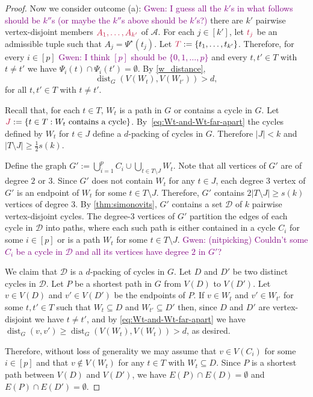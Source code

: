 \documentclass{patmorin}
\newcommand{\gwen}[1]{\textcolor{Purple}{Gwen: #1}}
\DeclareMathOperator{\dist}{dist}
\DeclarePairedDelimiter\set{\{}{\}}
\begin{document}
\begin{proof}
Now we consider outcome (a): 
\gwen{I guess all the $k'$s in what follows should be $k''$s (or maybe the $k''$s above should be $k'$s?)}
there are $k'$ pairwise vertex-disjoint members $\mathdefin{A_1,\ldots,A_{k'}}$ of $\mathcal{A}$. 
For each $j\in[k']$, let $\mathdefin{t_j}$ be an admissible tuple such that $A_j = \Psi^\star(t_j)$. 
Let $\mathdefin{T}:=\set{t_1,\ldots, t_{k'}}$. 
Therefore, for every $i\in[p]$ 
\gwen{I think $[p]$ should be $\{0,1,\dots, p\}$} 
and every $t,t'\in T$ with $t\neq t'$ we have $\Psi_i(t) \cap \Psi_i(t') = \emptyset$. 
By \cref{w_distance}, 
\begin{equation}\label{eq:Wt-and-Wt-far-apart}
\dist_G(V(W_{t}), V(W_{t'}))> d, 
\end{equation}
for all $t,t'\in T$ with $t\neq t'$. 

Recall that, for each $t\in T$, $W_t$ is a path in $G$ or contains a cycle in $G$. 
Let $\mathdefin{J}:=\{t\in T:\text{$W_t$ contains a cycle}\}$.  By~\eqref{eq:Wt-and-Wt-far-apart} the cycles defined by $W_t$ for $t\in J$ define a $d$-packing of cycles in $G$.  Therefore $|J|<k$ and $|T\setminus J|\geq \tfrac{1}{2}s(k)$.

Define the graph $G':=\bigcup_{i=1}^p C_i\cup \bigcup_{t\in T\setminus J} W_{t}$.  
Note that all vertices of $G'$ are of degree $2$ or $3$.  Since $G'$ does not contain $W_t$ for any $t\in J$, each degree $3$ vertex of $G'$ is an endpoint of $W_{t}$ for some $t\in T\setminus J$. 
Therefore, $G'$ contains $2|T\setminus J|\geq s(k)$ vertices of degree $3$.
By \cref{thm:simonovits}, $G'$ contains a set $\mathcal{D}$ of $k$ pairwise vertex-disjoint cycles.  The degree-$3$ vertices of $G'$ partition the edges of each cycle in $\mathcal{D}$ into paths, where each such path is either contained in a cycle $C_i$ for some $i\in[p]$ or is a path $W_t$ for some $t\in T\setminus J$.  
\gwen{(nitpicking) Couldn't some $C_i$ be a cycle in $\mathcal{D}$ and all its vertices have degree $2$ in $G'$?}

We claim that $\mathcal{D}$ is a $d$-packing of cycles in $G$. 
Let $D$ and $D'$ be two distinct cycles in $\mathcal{D}$.  Let $P$ be a shortest path in $G$ from $V(D)$ to $V(D')$.  Let $v\in V(D)$ and $v'\in V(D')$ be the endpoints of $P$.  If $v\in W_t$ and $v'\in W_{t'}$ for some $t,t'\in T$ such that $W_t\subseteq D$ and $W_{t'}\subseteq D'$ then, 
since $D$ and $D'$ are vertex-disjoint we have $t\neq t'$, and by \eqref{eq:Wt-and-Wt-far-apart} we have $\dist_G(v,v')\ge \dist_G(V(W_t),V(W_t))>d$, as desired.  

Therefore, without loss of generality we may assume that $v\in V(C_i)$ for some $i\in[p]$ and that $v\notin V(W_t)$ for any $t\in T$ with $W_t\subseteq D$.  Since $P$ is a shortest path between $V(D)$ and $V(D')$, we have $E(P)\cap E(D)=\emptyset$ and $E(P)\cap E(D')=\emptyset$.  


\end{proof}
\end{document}
